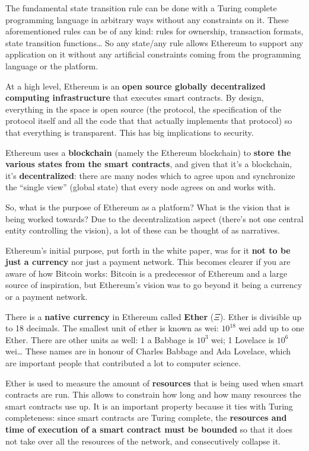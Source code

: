 The fundamental state transition rule can be done with a Turing complete
programming language in arbitrary ways without any constraints on it.
These aforementioned rules can be of any kind: rules for ownership,
transaction formats, state transition functions\ldots{} So any state/any
rule allows Ethereum to support any application on it without any
artificial constraints coming from the programming language or the
platform.

At a high level, Ethereum is an \textbf{open source globally
decentralized computing infrastructure} that executes smart contracts.
By design, everything in the space is open source (the protocol, the
specification of the protocol itself and all the code that that actually
implements that protocol) so that everything is transparent. This has
big implications to security.

Ethereum uses a \textbf{blockchain} (namely the Ethereum blockchain) to
\textbf{store the various states from the smart contracts}, and given
that it's a blockchain, it's \textbf{decentralized}: there are many
nodes which to agree upon and synchronize the ``single view'' (global
state) that every node agrees on and works with.

So, what is the purpose of Ethereum as a platform? What is the vision
that is being worked towards? Due to the decentralization aspect
(there's not one central entity controlling the vision), a lot of these
can be thought of as narratives.

Ethereum's initial purpose, put forth in the white paper, was for it
\textbf{not to be just a currency} nor just a payment network. This
becomes clearer if you are aware of how Bitcoin works: Bitcoin is a
predecessor of Ethereum and a large source of inspiration, but
Ethereum's vision was to go beyond it being a currency or a payment
network.

There is a \textbf{native currency} in Ethereum called \textbf{Ether}
($\Xi$). Ether is divisible up to 18 decimals. The smallest unit of
ether is known as wei: $10^{18}$ wei add up to one Ether. There are
other units as well: 1 a Babbage is $10^3$ wei; 1 Lovelace is $10^6$
wei\ldots{} These names are in honour of Charles Babbage and Ada
Lovelace, which are important people that contributed a lot to computer
science.

Ether is used to measure the amount of \textbf{resources} that is being
used when smart contracts are run. This allows to constrain how long and
how many resources the smart contracts use up. It is an important
property because it ties with Turing completeness: since smart contracts
are Turing complete, the \textbf{resources and time of execution of a
smart contract must be bounded} so that it does not take over all the
resources of the network, and consecutively collapse it.

